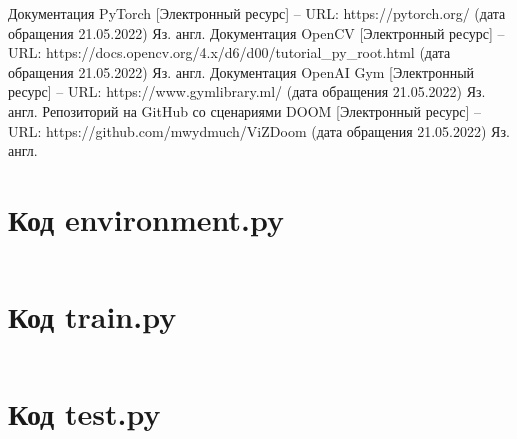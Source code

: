\documentclass[bachelor, och, coursework]{shiza}
\begin{document}
\begin{thebibliography}{3}
    Документация PyTorch [Электронный ресурс] – URL: https://pytorch.org/ (дата обращения 21.05.2022) Яз. англ.
    Документация OpenCV [Электронный ресурс] – URL: https://docs.opencv.org/4.x/d6/d00/tutorial_py_root.html (дата обращения 21.05.2022) Яз. англ.
    Документация OpenAI Gym [Электронный ресурс] – URL: https://www.gymlibrary.ml/ (дата обращения 21.05.2022) Яз. англ.
    Репозиторий на GitHub со сценариями DOOM [Электронный ресурс] – URL: https://github.com/mwydmuch/ViZDoom (дата обращения 21.05.2022) Яз. англ.
\end{thebibliography}

\appendix

    \section{Код environment.py}
    \inputminted[fontsize=\footnotesize]{text}{../environment.py}

    \section{Код train.py}
    \inputminted[fontsize=\footnotesize]{text}{../trainer.py}

    \section{Код test.py}
    \inputminted[fontsize=\footnotesize]{text}{../test.py}
\end{document}
